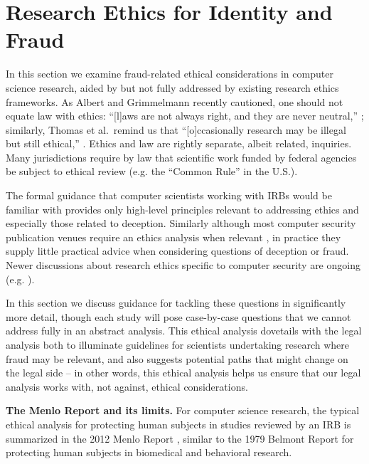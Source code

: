 \section{Research Ethics for Identity and Fraud}
\label{sec:ethics}

In this section we examine fraud-related ethical considerations in computer science research, aided by but not fully addressed by existing research ethics frameworks.
As Albert and Grimmelmann recently cautioned, one should not equate law with ethics: ``[l]aws are not always right, and they are never neutral,'' \cite{albert_right_2023}; similarly, Thomas et al.\ remind us that ``[o]ccasionally research may be illegal but still ethical,'' \cite{thomasEthicalIssuesResearch2017}. Ethics and law are rightly separate, albeit related, inquiries.
Many jurisdictions require by law that scientific work funded by federal agencies be subject to ethical review (e.g. the ``Common Rule'' \cite{protectionsohrpFederalPolicyProtection2009} in the U.S.).


The formal guidance that computer scientists working with IRBs would be familiar with provides only high-level principles relevant to addressing ethics and especially those related to deception. Similarly although most computer security publication venues require an ethics analysis when relevant \cite{finnEthicsGovernanceDevelopment2023}, in practice they supply little practical advice when considering questions of deception or fraud.
Newer discussions about research ethics specific to computer security are ongoing (e.g. \cite{FosteringResponsibleComputing,cranorConferenceSubmissionReview,kohnoEthicalFrameworksComputer}).

In this section we discuss guidance for tackling these questions in significantly more detail, though each study will pose case-by-case questions that we cannot address fully in an abstract analysis.
This ethical analysis dovetails with the legal analysis both to illuminate guidelines for scientists undertaking research where fraud may be relevant, and also suggests potential paths that might change on the legal side -- in other words, this ethical analysis helps us ensure that our legal analysis works with, not against, ethical considerations.

\textbf{The Menlo Report and its limits.} For computer science research, the typical ethical analysis for protecting human subjects in studies reviewed by an IRB is summarized in the 2012 Menlo Report \cite{menloReport}, similar to the 1979 Belmont Report \cite{belmontReport} for protecting human subjects in biomedical and behavioral research.



